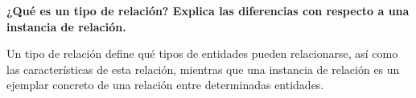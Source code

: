 \item \textbf{¿Qué es un tipo de relación? Explica las diferencias con respecto a una instancia de relación.}

Un tipo de relación define qué tipos de entidades pueden relacionarse, así como las características de esta relación, mientras que una instancia de relación es un ejemplar concreto de una relación entre determinadas entidades.
